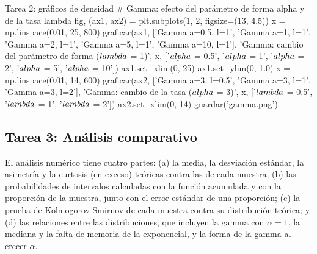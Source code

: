 \documentclass[11pt,letterpaper]{article}
\begin{document}
\begin{codigo}[label=cod:t2]{Tarea 2: gráficos de densidad}
# Gamma: efecto del parámetro de forma alpha y de la tasa lambda
fig, (ax1, ax2) = plt.subplots(1, 2, figsize=(13, 4.5))
x = np.linspace(0.01, 25, 800)
graficar(ax1, ['Gamma a=0.5, l=1', 'Gamma a=1, l=1', 'Gamma a=2, l=1', 'Gamma a=5, l=1',
               'Gamma a=10, l=1'],
         'Gamma: cambio del parámetro de forma ($\\lambda$ = 1)', x,
         ['$\\alpha$ = 0.5', '$\\alpha$ = 1', '$\\alpha$ = 2', '$\\alpha$ = 5', '$\\alpha$ = 10'])
ax1.set_xlim(0, 25)
ax1.set_ylim(0, 1.0)
x = np.linspace(0.01, 14, 600)
graficar(ax2, ['Gamma a=3, l=0.5', 'Gamma a=3, l=1', 'Gamma a=3, l=2'],
         'Gamma: cambio de la tasa ($\\alpha$ = 3)', x,
         ['$\\lambda$ = 0.5', '$\\lambda$ = 1', '$\\lambda$ = 2'])
ax2.set_xlim(0, 14)
guardar('gamma.png')
\end{codigo}

\subsection{Tarea 3: Análisis comparativo}

El análisis numérico tiene cuatro partes: (a) la media, la desviación estándar, la asimetría y la curtosis (en exceso) teóricas contra las de cada muestra; (b) las probabilidades de intervalos calculadas con la función acumulada y con la proporción de la muestra, junto con el error estándar de una proporción; (c) la prueba de Kolmogorov-Smirnov de cada muestra contra su distribución teórica; y (d) las relaciones entre las distribuciones, que incluyen la gamma con $\alpha = 1$, la mediana y la falta de memoria de la exponencial, y la forma de la gamma al crecer $\alpha$.
\end{document}
